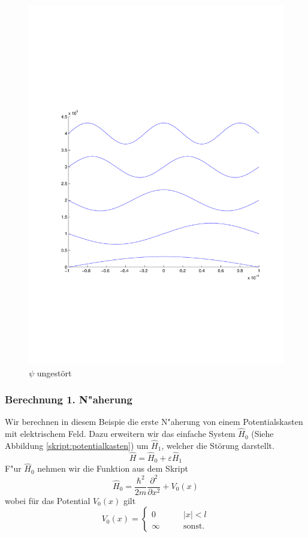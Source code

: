 \begin{refsection}
\begin{figure}
 \centering
 \includegraphics[width=12cm,clip=true,trim=2cm 7cm 1cm 8cm]{efeld/Psi_ungestoert.pdf}
 \caption{$\psi$ ungest\"ort}
 \label{abb:efeld_psi_ungestoert}
\end{figure}








\subsubsection{Berechnung 1. N"aherung}


Wir berechnen in diesem Beispie die erste N"aherung von einem Potentialskasten mit elektrischem Feld.
Dazu erweitern wir das einfache System  $\hat H_0$
(Siehe Abbildung \ref{skript:potentialkasten})
um $\hat H_1$, welcher die Störung darstellt.
\[
  \hat{H} = \hat H_0 + \varepsilon \hat H_1
\]
F"ur $\hat H_0$ nehmen wir die Funktion aus dem Skript
\[
  \hat H_0 = \frac{\hbar^2}{2m} \frac{\partial^2}{\partial x^2} + V_0(x)
\]
wobei f\"ur das Potential $V_0(x)$ gilt
\begin{equation}
  \label{eq:efeld_v0_kasten}
  V_0(x)=\begin{cases}
    0       & \qquad |x|<l\\
    \infty  & \qquad\text{sonst.}
  \end{cases}
\end{equation}


\end{refsection}
